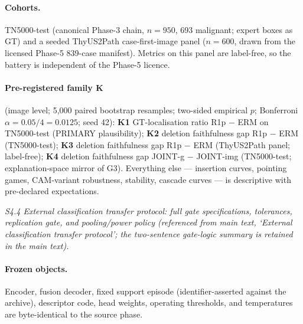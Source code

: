 \documentclass[11pt]{article}
\begin{document}
\paragraph{Cohorts.} TN5000-test (canonical Phase-3 chain, $n{=}950$, 693
malignant; expert boxes as GT) and a seeded ThyUS2Path case-first-image
panel ($n{=}600$, drawn from the licensed Phase-5 839-case manifest).
Metrics on this panel are label-free, so the battery is independent of
the Phase-5 licence.

\paragraph{Pre-registered family K} (image level; 5{,}000 paired bootstrap
resamples; two-sided empirical $p$; Bonferroni $\alpha = 0.05/4 = 0.0125$;
seed 42): \textbf{K1} GT-localisation ratio R1p $-$ ERM on TN5000-test
(PRIMARY plausibility); \textbf{K2} deletion faithfulness gap R1p $-$ ERM
(TN5000-test); \textbf{K3} deletion faithfulness gap R1p $-$ ERM
(ThyUS2Path panel; label-free); \textbf{K4} deletion faithfulness gap
JOINT-g $-$ JOINT-img (TN5000-test; explanation-space mirror of G3).
Everything else --- insertion curves, pointing games, CAM-variant
robustness, stability, cascade curves --- is descriptive with
pre-declared expectations.


\noindent\emph{S4.4 External classification transfer protocol: full gate specifications, tolerances, replication gate, and pooling/power policy (referenced from main text, `External classification transfer protocol'; the two-sentence gate-logic summary is retained in the main text).}

\paragraph{Frozen objects.}
Encoder, fusion decoder, fixed support episode (identifier-asserted against
the archive), descriptor code, head weights, operating thresholds, and
temperatures are byte-identical to the source phase.
\end{document}
